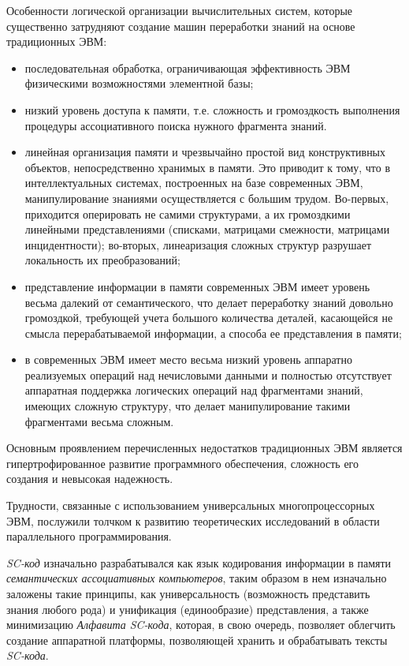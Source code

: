 Особенности логической организации вычислительных систем, которые существенно затрудняют создание машин переработки знаний на основе традиционных ЭВМ:
\begin{itemize}
	\item последовательная обработка, ограничивающая эффективность ЭВМ физическими возможностями элементной базы;
	\item низкий уровень доступа к памяти, т.е. сложность и громоздкость выполнения процедуры ассоциативного поиска нужного фрагмента знаний. 
	\item линейная организация памяти и чрезвычайно простой вид конструктивных объектов, непосредственно хранимых в памяти. Это приводит к тому, что в интеллектуальных системах, построенных на базе современных ЭВМ, манипулирование знаниями осуществляется с большим трудом. Во-первых, приходится оперировать не самими структурами, а их громоздкими линейными представлениями (списками, матрицами смежности, матрицами инцидентности); во-вторых, линеаризация сложных структур разрушает локальность их преобразований;
	\item представление информации в памяти современных ЭВМ имеет уровень весьма далекий от семантического, что делает переработку знаний довольно громоздкой, требующей учета большого количества деталей, касающейся не смысла перерабатываемой информации, а способа ее представления в памяти;
	\item в современных ЭВМ имеет место весьма низкий уровень аппаратно реализуемых операций над нечисловыми данными и полностью отсутствует аппаратная поддержка логических операций над фрагментами знаний, имеющих сложную структуру, что делает манипулирование такими фрагментами весьма сложным.
\end{itemize}
	
Основным проявлением перечисленных недостатков традиционных ЭВМ является гипертрофированное развитие программного обеспечения, сложность его создания и невысокая надежность.

Трудности, связанные с использованием универсальных многопроцессорных ЭВМ, послужили толчком к развитию теоретических исследований в области параллельного программирования.
	
\textit{SC-код} изначально разрабатывался как язык кодирования информации в памяти \textit{семантических ассоциативных компьютеров}, таким образом в нем изначально заложены такие принципы, как универсальность (возможность представить знания любого рода) и унификация (единообразие) представления, а также минимизацию \textit{Алфавита SC-кода}, которая, в свою очередь, позволяет облегчить создание аппаратной платформы, позволяющей хранить и обрабатывать тексты \textit{SC-кода}.

